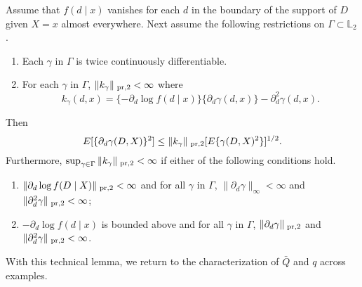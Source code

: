 \begin{lemma}\label{lemma:rp}
Assume that $f(d\mid x)$ vanishes for each $d$ in the boundary of the support of $D$ given $X=x$ almost everywhere. Next assume the following restrictions on $\Gamma \subset \mathbb{L}_2$.
\begin{enumerate}
    \item Each $\gamma$ in $\Gamma$ is twice continuously differentiable.
    \item For each $\gamma$ in $\Gamma$, $\|k_{\gamma}\|_{\text{ \normalfont pr},2}<\infty$ where
    $$
    k_{\gamma}(d,x)=\{-\partial_d \log f(d\mid x)\}\{\partial_d\gamma(d,x)\}-\partial_d^2 \gamma(d,x).
    $$
\end{enumerate}
Then 
$$
E[\{\partial_d\gamma(D,X)\}^2]\leq \|k_{\gamma}\|_{\text{ \normalfont pr},2} [E \{\gamma(D,X)^2\}]^{1/2}.
$$
Furthermore, $\sup_{\gamma \in \Gamma} \|k_{\gamma}\|_{\text{ \normalfont pr},2}<\infty$ if either of the following conditions hold.
\begin{enumerate}
    \item $\|\partial_d \log f(D\mid X)\|_{\text{ \normalfont pr},2}<\infty$ and for all $\gamma$ in $\Gamma$, $\|\partial_d \gamma\|_{\infty}<\infty$ and $\|\partial^2_d \gamma\|_{\text{ \normalfont pr},2}<\infty$;
    \item $-\partial_d \log f(d\mid x)$ is bounded above and for all $\gamma$ in $\Gamma$,  $\|\partial_d \gamma\|_{\text{ \normalfont pr},2}$ and $\|\partial^2_d \gamma\|_{\text{ \normalfont pr},2}<\infty$.
\end{enumerate}
\end{lemma}

With this technical lemma, we return to the characterization of $\bar{Q}$ and $q$ across examples.

